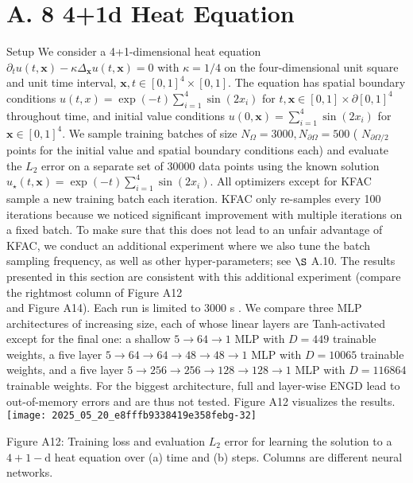 \documentclass[10pt]{article}
\begin{document}
\section*{A. 8 4+1d Heat Equation}
Setup We consider a 4+1-dimensional heat equation $\partial_{t} u(t, \boldsymbol{x})-\kappa \Delta_{\boldsymbol{x}} u(t, \boldsymbol{x})=0$ with $\kappa=1 / 4$ on the four-dimensional unit square and unit time interval, $\boldsymbol{x}, t \in[0,1]^{4} \times[0,1]$. The equation has spatial boundary conditions $u(t, x)=\exp (-t) \sum_{i=1}^{4} \sin \left(2 x_{i}\right)$ for $t, \boldsymbol{x} \in[0,1] \times \partial[0,1]^{4}$ throughout time, and initial value conditions $u(0, \boldsymbol{x})=\sum_{i=1}^{4} \sin \left(2 x_{i}\right)$ for $\boldsymbol{x} \in[0,1]^{4}$. We sample training batches of size $N_{\Omega}=3000, N_{\partial \Omega}=500$ ( $N_{\partial \Omega / 2}$ points for the initial value and spatial boundary conditions each) and evaluate the $L_{2}$ error on a separate set of 30000 data points using the known solution $u_{\star}(t, \boldsymbol{x})=\exp (-t) \sum_{i=1}^{4} \sin \left(2 x_{i}\right)$. All optimizers except for KFAC sample a new training batch each iteration. KFAC only re-samples every 100 iterations because we noticed significant improvement with multiple iterations on a fixed batch. To make sure that this does not lead to an unfair advantage of KFAC, we conduct an additional experiment where we also tune the batch sampling frequency, as well as other hyper-parameters; see $\S$ A.10. The results presented in this section are consistent with this additional experiment (compare the rightmost column of Figure A12\\
and Figure A14). Each run is limited to 3000 s . We compare three MLP architectures of increasing size, each of whose linear layers are Tanh-activated except for the final one: a shallow $5 \rightarrow 64 \rightarrow 1$ MLP with $D=449$ trainable weights, a five layer $5 \rightarrow 64 \rightarrow 64 \rightarrow 48 \rightarrow 48 \rightarrow 1$ MLP with $D=10065$ trainable weights, and a five layer $5 \rightarrow 256 \rightarrow 256 \rightarrow 128 \rightarrow 128 \rightarrow 1$ MLP with $D=116864$ trainable weights. For the biggest architecture, full and layer-wise ENGD lead to out-of-memory errors and are thus not tested. Figure A12 visualizes the results.\\
\texttt{[image: 2025\_05\_20\_e8fffb9338419e358febg-32]}

Figure A12: Training loss and evaluation $L_{2}$ error for learning the solution to a $4+1-\mathrm{d}$ heat equation over (a) time and (b) steps. Columns are different neural networks.
\end{document}
